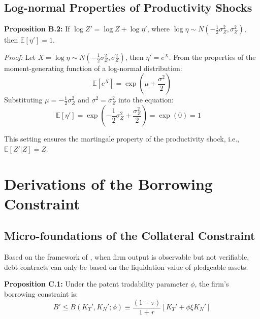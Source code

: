 \documentclass[12pt,a4paper]{article}
\begin{document}
\subsection{Log-normal Properties of Productivity Shocks}
\textbf{Proposition B.2:} If $\log Z' = \log Z + \log \eta'$, where $\log \eta \sim N(-\frac{1}{2}\sigma_Z^2, \sigma_Z^2)$, then $\mathbb{E}[\eta'] = 1$.

\textit{Proof:}
Let $X = \log \eta \sim N(-\frac{1}{2}\sigma_Z^2, \sigma_Z^2)$, then $\eta' = e^X$.
From the properties of the moment-generating function of a log-normal distribution:
\begin{equation}
\mathbb{E}[e^X] = \exp \left( \mu + \frac{\sigma^2}{2} \right)
\end{equation}
Substituting $\mu = -\frac{1}{2}\sigma_Z^2$ and $\sigma^2 = \sigma_Z^2$ into the equation:
\begin{equation}
\mathbb{E}[\eta'] = \exp \left( -\frac{1}{2}\sigma_Z^2 + \frac{\sigma_Z^2}{2} \right) = \exp(0) = 1 \quad 
\end{equation}

This setting ensures the martingale property of the productivity shock, i.e., $\mathbb{E}[Z' | Z] = Z$.

\section{Derivations of the Borrowing Constraint}\label{app:C}

\subsection{Micro-foundations of the Collateral Constraint}
Based on the framework of \cite{hart1994theory}, when firm output is observable but not verifiable, debt contracts can only be based on the liquidation value of pledgeable assets.

\textbf{Proposition C.1:} Under the patent tradability parameter $\phi$, the firm's borrowing constraint is:
\begin{equation}
B' \le \bar{B}(K_T', K_N'; \phi) \equiv \frac{(1-\tau)}{1+r} [K_T' + \phi \xi K_N']
\end{equation}
\end{document}
